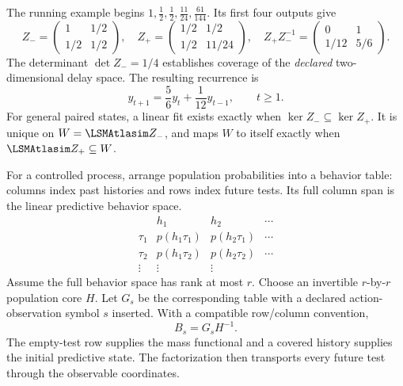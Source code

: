 \documentclass[11pt,oneside,openany]{book}
\numberwithin{equation}{section}
\begin{document}
The running example begins $1,\tfrac12,\tfrac12,\tfrac{11}{24},\tfrac{61}{144}$. Its first four outputs give
\[
Z_-=\begin{pmatrix}1&1/2\\1/2&1/2\end{pmatrix},\quad
Z_+=\begin{pmatrix}1/2&1/2\\1/2&11/24\end{pmatrix},\quad
Z_+Z_-^{-1}=\begin{pmatrix}0&1\\1/12&5/6\end{pmatrix}.
\]
The determinant $\det Z_-=1/4$ establishes coverage of the \emph{declared} two-dimensional delay space. The resulting recurrence is
\[
y_{t+1}=\frac56y_t+\frac1{12}y_{t-1},\qquad t\geq1.
\]
For general paired states, a linear fit exists exactly when $\ker Z_-\subseteq\ker Z_+$. It is unique on $W=\LSMAtlasim Z_-$, and maps $W$ to itself exactly when $\LSMAtlasim Z_+\subseteq W$.

For a controlled process, arrange population probabilities into a behavior table: columns index past histories and rows index future tests. Its full column span is the linear predictive behavior space.
\[
\begin{array}{c|ccc}
 & h_1 & h_2 & \cdots\\\hline
\tau_1 & p(h_1\tau_1)&p(h_2\tau_1)&\cdots\\
\tau_2 & p(h_1\tau_2)&p(h_2\tau_2)&\cdots\\
\vdots &\vdots&\vdots&
\end{array}
\]
Assume the full behavior space has rank at most $r$. Choose an invertible $r$-by-$r$ population core $H$. Let $G_s$ be the corresponding table with a declared action-observation symbol $s$ inserted. With a compatible row/column convention,
\[
\boxed{B_s=G_sH^{-1}.}
\]
The empty-test row supplies the mass functional and a covered history supplies the initial predictive state. The factorization then transports every future test through the observable coordinates.
\end{document}
